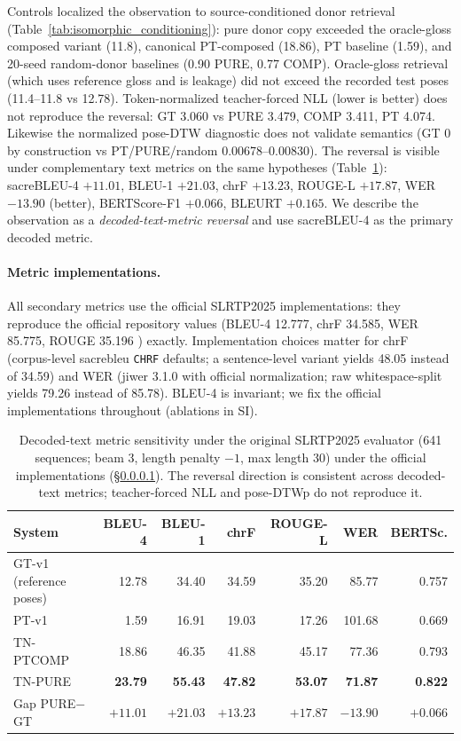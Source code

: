 \documentclass[pdflatex,sn-chicago]{sn-jnl}
\begin{document}
Controls localized the observation to source-conditioned donor retrieval (Table~\ref{tab:isomorphic_conditioning}): pure donor copy exceeded the oracle-gloss composed variant (11.8), canonical PT-composed (18.86), PT baseline (1.59), and 20-seed random-donor baselines (0.90 PURE, 0.77 COMP). Oracle-gloss retrieval (which uses reference gloss and is leakage) did not exceed the recorded test poses (11.4--11.8 vs 12.78). Token-normalized teacher-forced NLL (lower is better) does not reproduce the reversal: GT 3.060 vs PURE 3.479, COMP 3.411, PT 4.074. Likewise the normalized pose-DTW diagnostic does not validate semantics (GT 0 by construction vs PT/PURE/random 0.00678--0.00830). The reversal is visible under complementary text metrics on the same hypotheses (Table~\ref{tab:metric_sensitivity}): sacreBLEU-4 $+11.01$, BLEU-1 $+21.03$, chrF $+13.23$, ROUGE-L $+17.87$, WER $-13.90$ (better), BERTScore-F1 $+0.066$, BLEURT $+0.165$. We describe the observation as a \emph{decoded-text-metric reversal} and use sacreBLEU-4 as the primary decoded metric.

\paragraph{Metric implementations.}
\label{sec:metric_protocol_alignment}
All secondary metrics use the official SLRTP2025 implementations: they reproduce the official repository values (BLEU-4 12.777, chrF 34.585, WER 85.775, ROUGE 35.196 \cite{slrtp2025}) exactly. Implementation choices matter for chrF (corpus-level sacrebleu \texttt{CHRF} defaults; a sentence-level variant yields 48.05 instead of 34.59) and WER (jiwer 3.1.0 with official normalization; raw whitespace-split yields 79.26 instead of 85.78). BLEU-4 is invariant; we fix the official implementations throughout (ablations in SI).

\begin{table}[t]
\centering
\scriptsize\setlength{\tabcolsep}{3pt}
\caption{Decoded-text metric sensitivity under the original SLRTP2025 evaluator (641 sequences; beam 3, length penalty $-1$, max length 30) under the official implementations (\S\ref{sec:metric_protocol_alignment}). The reversal direction is consistent across decoded-text metrics; teacher-forced NLL and pose-DTWp do not reproduce it.}
\label{tab:metric_sensitivity}
\begin{tabular}{lrrrrrr}
\toprule
System & BLEU-4 & BLEU-1 & chrF & ROUGE-L & WER & BERTSc. \\
\midrule
GT-v1 (reference poses) & 12.78 & 34.40 & 34.59 & 35.20 & 85.77 & 0.757 \\
PT-v1         & 1.59 & 16.91 & 19.03 & 17.26 & 101.68 & 0.669 \\
TN-PTCOMP  & 18.86 & 46.35 & 41.88 & 45.17 & 77.36 & 0.793 \\
TN-PURE    & \textbf{23.79} & \textbf{55.43} & \textbf{47.82} & \textbf{53.07} & \textbf{71.87} & \textbf{0.822} \\
\midrule
Gap PURE$-$GT & $+11.01$ & $+21.03$ & $+13.23$ & $+17.87$ & $-13.90$ & $+0.066$ \\
\bottomrule
\end{tabular}
\end{table}
\end{document}
